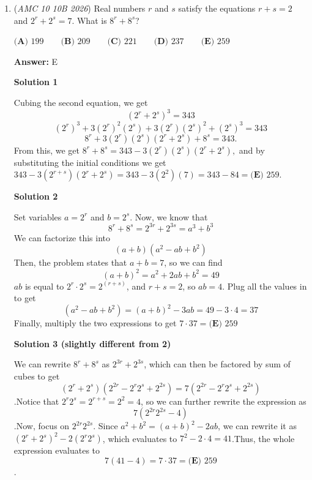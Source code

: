 \begin{enumerate}
 --aditya.a

 \textbf{Remark} This question is essentially identical to \href{https://artofproblemsolving.com/wiki/index.php/2014\_AMC\_10B\_Problems/Problem\_19?srsltid=AYCX9vKbbj8maRYA9MC7XylocHkZuKkOfb6QyB3uCHPitRsM2Xg4p\_Bz}{2014 AMC 10B \#19}. 

 


	\item (\textit{AMC 10 10B 2026}) Real numbers $r$ and $s$ satisfy the equations $r+s=2$ and $2^r+2^s=7.$ What is $8^r+8^s$?


 $\textbf{(A) } 199 \qquad \textbf{(B) } 209 \qquad \textbf{(C) } 221 \qquad \textbf{(D) } 237 \qquad \textbf{(E) } 259$

 \textbf{Answer: }E



\textbf{Solution 1}

Cubing the second equation, we get 
 \[(2^r+2^s)^3=343\]
 \[(2^r)^3+3(2^r)^2(2^s)+3(2^r)(2^s)^2+(2^s)^3=343\]
 \[8^r+3(2^r)(2^s)(2^r+2^s)+8^s=343.\]From this, we get $8^r+8^s=343-3(2^r)(2^s)(2^r+2^s),$ and by substituting the initial conditions we get $343-3(2^{r+s})(2^r+2^s)=343-3(2^2)(7)=343-84=\boxed{\textbf{(E) }259}$.

 



\textbf{Solution 2}

Set variables $a=2^r$ and $b=2^s$. Now, we know that
 \[8^r+8^s=2^{3r}+2^{3s}=a^3+b^3\]We can factorize this into 
 \[(a+b)(a^2-ab+b^2)\]Then, the problem states that $a+b=7$, so we can find
 \[(a+b)^2=a^2+2ab+b^2=49\]$ab$ is equal to $2^r\cdot2^s=2^{(r+s)}$, and $r+s=2$, so $ab=4$. Plug all the values in to get
 \[(a^2-ab+b^2)=(a+b)^2-3ab=49-3\cdot4 = 37\]Finally, multiply the two expressions to get $7\cdot37 = \boxed{\textbf{(E) }259}$




\textbf{Solution 3 (slightly different from 2)}

We can rewrite $8^r+8^s$ as $2^{3r}+2^{3s}$, which can then be factored by sum of cubes to get 
 \[(2^r+2^s)(2^{2r}-2^r2^s+2^{2s}) = 7(2^{2r}-2^r2^s+2^{2s})\].Notice that $2^r2^s=2^{r+s}=2^2=4$, so we can further rewrite the expression as 
 \[7(2^{2r}2^{2s}-4)\].Now, focus on $2^{2r}2^{2s}$. Since $a^2+b^2=(a+b)^2-2ab$, we can rewrite it as $(2^r+2^s)^2-2(2^r2^s)$, which evaluates to $7^2-2\cdot4=41$.Thus, the whole expression evaluates to 
 \[7(41-4)=7\cdot37=\boxed{\textbf{(E) }259}\].

 




\end{enumerate}
